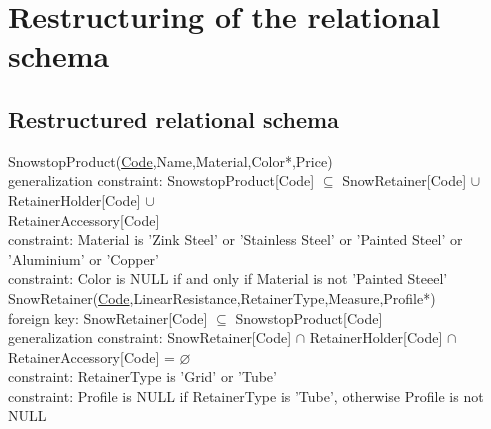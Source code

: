 \documentclass{article}[h]
\begin{document}
{\pagebreak

\section{Restructuring of the relational schema}

\subsection{Restructured relational schema}

\vspace{12px}

{\color{ForestGreen}SnowstopProduct(\underline{Code},Name,Material,Color*,Price)}\\
{\color{Orange}\hspace{2mm} generalization constraint: {\color{Magenta} SnowstopProduct[Code] $\subseteq $ SnowRetainer[Code] $\cup$ RetainerHolder[Code] $\cup$ }} \\ 
{{\color{Magenta}\hspace{39mm} RetainerAccessory[Code] }} \\
{\color{Orange}\hspace{2mm} constraint: {\color{Magenta}Material is 'Zink Steel' or 'Stainless Steel' or 'Painted Steel' or 'Aluminium' or 'Copper'}} \\ 
{\color{Orange}\hspace{2mm} constraint: {\color{Magenta}Color is NULL if and only if Material is not 'Painted Steeel'}} \\ 

{\color{ForestGreen}SnowRetainer(\underline{Code},LinearResistance,RetainerType,Measure,Profile*)}\\
{\color{Orange}\hspace{2mm} foreign key: {\color{Magenta}SnowRetainer[Code] $\subseteq$ SnowstopProduct[Code]}} \\
{\color{Orange}\hspace{2mm} generalization constraint: {\color{Magenta} SnowRetainer[Code] $\cap $ RetainerHolder[Code] $\cap$ RetainerAccessory[Code] = $\varnothing $}} \\ 
{\color{Orange}\hspace{2mm} constraint: {\color{Magenta}RetainerType is 'Grid' or 'Tube'}} \\
{\color{Orange}\hspace{2mm} constraint: {\color{Magenta}Profile is NULL if RetainerType is 'Tube', otherwise Profile is not NULL}} \\

}
\end{document}
